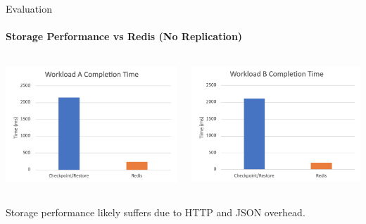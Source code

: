 \documentclass{beamer}
\begin{document}
\begin{frame}{Evaluation}
  \framesubtitle{Storage Performance vs Redis (No Replication)}

  \begin{columns}
    \includegraphics[scale=0.4]{../paper/redis-workload-A}

    \includegraphics[scale=0.2]{../paper/redis-workload-B}
  \end{columns}

  \hspace{1cm}

  \centering
  Storage performance likely suffers due to HTTP and JSON overhead.
\end{frame}
\end{document}
